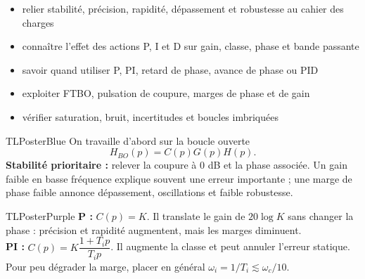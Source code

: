 \documentclass[10pt,a3paper]{article}
\begin{document}
\vspace{2mm}
\begin{minipage}[t]{0.60\linewidth}
\begin{TLPosterSavoirs}
\begin{itemize}
  \item relier stabilité, précision, rapidité, dépassement et robustesse au cahier des charges
  \item connaître l'effet des actions P, I et D sur gain, classe, phase et bande passante
  \item savoir quand utiliser P, PI, retard de phase, avance de phase ou PID
  \item exploiter FTBO, pulsation de coupure, marges de phase et de gain
  \item vérifier saturation, bruit, incertitudes et boucles imbriquées
\end{itemize}
\end{TLPosterSavoirs}
\end{minipage}\hfill
\begin{minipage}[t]{0.37\linewidth}
\end{minipage}
\vfill
\begin{minipage}[t]{0.49\linewidth}
\begin{TLPosterBloc}{TLPosterBlue}
On travaille d'abord sur la boucle ouverte
\[
H_{BO}(p)=C(p)G(p)H(p).
\]
\textbf{Stabilité prioritaire :} relever la coupure à $0$ dB et la phase associée. Un gain faible en basse fréquence explique souvent une erreur importante ; une marge de phase faible annonce dépassement, oscillations et faible robustesse.
\end{TLPosterBloc}
\begin{TLPosterBloc}{TLPosterPurple}
\textbf{P :} $C(p)=K$. Il translate le gain de $20\log K$ sans changer la phase : précision et rapidité augmentent, mais les marges diminuent.\\[1mm]
\textbf{PI :} $C(p)=K\dfrac{1+T_i p}{T_i p}$. Il augmente la classe et peut annuler l'erreur statique. Pour peu dégrader la marge, placer en général $\omega_i=1/T_i\lesssim\omega_c/10$.
\end{TLPosterBloc}
\end{minipage}\hfill
\end{document}

